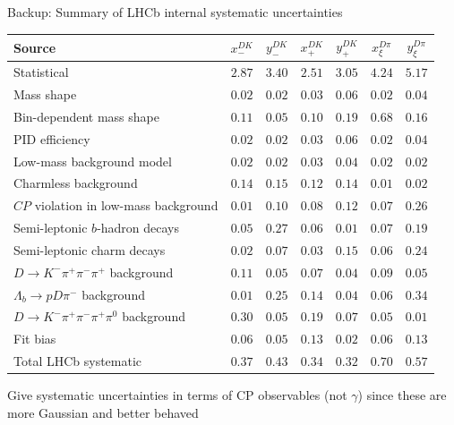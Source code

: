 \documentclass[xcolor={dvipsnames}]{beamer}
\begin{document}
\begin{frame}{Backup: Summary of LHCb internal systematic uncertainties}
  \scriptsize
  \vspace{0.02cm}
  \begin{center}
    \begin{tabular}{lcccccc}
      \hline
      Source & $x_-^{DK}$ & $y_-^{DK}$ & $x_+^{DK}$ & $y_+^{DK}$ & $x_\xi^{D\pi}$ & $y_\xi^{D\pi}$ \\
      \hline
      Statistical                                                & $2.87$ & $3.40$ & $2.51$ & $3.05$ & $4.24$ & $5.17$ \\
      \hline
      Mass shape                                                 & $0.02$ & $0.02$ & $0.03$ & $0.06$ & $0.02$ & $0.04$ \\
      Bin-dependent mass shape                                   & $0.11$ & $0.05$ & $0.10$ & $0.19$ & $0.68$ & $0.16$ \\
      PID efficiency                                             & $0.02$ & $0.02$ & $0.03$ & $0.06$ & $0.02$ & $0.04$ \\
      Low-mass background model                                  & $0.02$ & $0.02$ & $0.03$ & $0.04$ & $0.02$ & $0.02$ \\
      Charmless background                                       & $0.14$ & $0.15$ & $0.12$ & $0.14$ & $0.01$ & $0.02$ \\
      $C\!P$ violation in low-mass background                    & $0.01$ & $0.10$ & $0.08$ & $0.12$ & $0.07$ & $0.26$ \\
      Semi-leptonic $b$-hadron decays                            & $0.05$ & $0.27$ & $0.06$ & $0.01$ & $0.07$ & $0.19$ \\
      Semi-leptonic charm decays                                 & $0.02$ & $0.07$ & $0.03$ & $0.15$ & $0.06$ & $0.24$ \\
      $D\to K^-\pi^+\pi^-\pi^+$ background                       & $0.11$ & $0.05$ & $0.07$ & $0.04$ & $0.09$ & $0.05$ \\
      $\Lambda_b\to pD\pi^-$ background                          & $0.01$ & $0.25$ & $0.14$ & $0.04$ & $0.06$ & $0.34$ \\
      $D\to K^-\pi^+\pi^-\pi^+\pi^0$ background                  & $0.30$ & $0.05$ & $0.19$ & $0.07$ & $0.05$ & $0.01$ \\
      Fit bias                                                   & $0.06$ & $0.05$ & $0.13$ & $0.02$ & $0.06$ & $0.13$ \\
      \hline
      Total LHCb systematic                                      & $0.37$ & $0.43$ & $0.34$ & $0.32$ & $0.70$ & $0.57$ \\
      \hline
    \end{tabular}
  \end{center}
  \begin{center}
    {\normalsize Give systematic uncertainties in terms of CP observables (not $\gamma$) since these are more Gaussian and better behaved}
  \end{center}
\end{frame}
\end{document}
